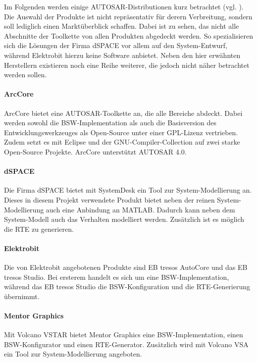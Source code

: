 \documentclass[
  a4paper,					    %
  twoside,
  DIV=calc,     				%
  bibliography=totoc,
  cleardoublepage=empty,
  ngerman,     					%
  final       					%
]{scrbook}
\begin{document}
Im Folgenden werden einige AUTOSAR-Distributionen kurz betrachtet (vgl. \cite{wiki:autosar}). Die Auswahl der Produkte ist nicht repräsentativ für derern Verbreitung, sondern soll lediglich einen Marktüberblick schaffen. Dabei ist zu sehen, das nicht alle Abschnitte der Toolkette von allen Produkten abgedeckt werden. So spezialisieren sich die Lösungen der Firma dSPACE vor allem auf den System-Entwurf, während Elektrobit hierzu keine Software anbietet. Neben den hier erwähnten Herstellern existieren noch eine Reihe weiterer, die jedoch nicht näher betrachtet werden sollen.

\paragraph{ArcCore}
ArcCore bietet eine AUTOSAR-Toolkette an, die alle Bereiche abdeckt. Dabei werden sowohl die BSW-Implementation als auch die Basisversion des Entwicklungswerkzeuges als Open-Source unter einer GPL-Lizenz vertrieben. Zudem setzt es mit Eclipse und der GNU-Compiler-Collection auf zwei starke Open-Source Projekte. ArcCore unterstützt AUTOSAR 4.0.

\paragraph{dSPACE}
Die Firma dSPACE bietet mit SystemDesk ein Tool zur System-Modellierung an. Dieses in diesem Projekt verwendete Produkt bietet neben der reinen System-Modellierung auch eine Anbindung an MATLAB. Dadurch kann neben dem System-Modell auch das Verhalten modelliert werden. Zusätzlich ist es möglich die RTE zu generieren.

\paragraph{Elektrobit}
Die von Elektrobit angebotenen Produkte sind EB tresos AutoCore und das EB tresos Studio. Bei ersterem handelt es sich um eine BSW-Implementation, während das EB tresos Studio die BSW-Konfiguration und die RTE-Generierung übernimmt.

\paragraph{Mentor Graphics}
Mit Volcano VSTAR bietet Mentor Graphics eine BSW-Implementation, einen BSW-Konfigurator und einen RTE-Generator. Zusätzlich wird mit Volcano VSA ein Tool zur System-Modellierung angeboten.
\end{document}
